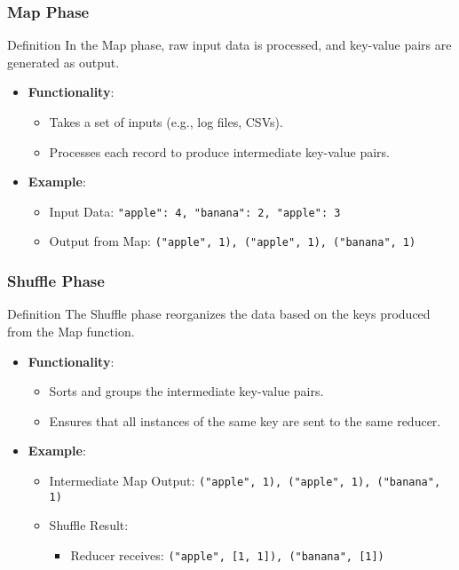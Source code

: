 \documentclass[aspectratio=169]{beamer}
\begin{document}
\begin{frame}[fragile]
    \frametitle{Map Phase}
    \begin{block}{Definition}
        In the Map phase, raw input data is processed, and key-value pairs are generated as output.
    \end{block}
    \begin{itemize}
        \item \textbf{Functionality}:
        \begin{itemize}
            \item Takes a set of inputs (e.g., log files, CSVs).
            \item Processes each record to produce intermediate key-value pairs.
        \end{itemize}
        \item \textbf{Example}: 
        \begin{itemize}
            \item Input Data: \texttt{"apple": 4, "banana": 2, "apple": 3}
            \item Output from Map: \texttt{("apple", 1), ("apple", 1), ("banana", 1)}
        \end{itemize}
    \end{itemize}
\end{frame}

\begin{frame}[fragile]
    \frametitle{Shuffle Phase}
    \begin{block}{Definition}
        The Shuffle phase reorganizes the data based on the keys produced from the Map function.
    \end{block}
    \begin{itemize}
        \item \textbf{Functionality}:
        \begin{itemize}
            \item Sorts and groups the intermediate key-value pairs.
            \item Ensures that all instances of the same key are sent to the same reducer.
        \end{itemize}
        \item \textbf{Example}:
        \begin{itemize}
            \item Intermediate Map Output: \texttt{("apple", 1), ("apple", 1), ("banana", 1)}
            \item Shuffle Result: 
            \begin{itemize}
                \item Reducer receives: \texttt{("apple", [1, 1]), ("banana", [1])}
            \end{itemize}
        \end{itemize}
    \end{itemize}
\end{frame}
\end{document}
